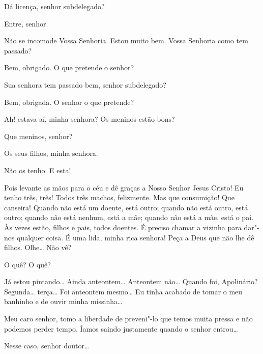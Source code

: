 \begin{linenumbers}
{}


  Dá licença, senhor
subdelegado?

 Entre, senhor. 

  Não se incomode
Vossa Senhoria. Estou muito bem. Vossa Senhoria como tem passado?

 Bem, obrigado. O que pretende o senhor?

 Sua senhora tem passado bem, senhor subdelegado?

 Bem, obrigada. O senhor o que pretende?

 Ah! estava aí, minha senhora? Os meninos estão bons?

 Que meninos, senhor?

 Os seus filhos, minha senhora.

 Não os tenho. E esta!

 Pois levante as mãos para o céu e dê graças a Nosso Senhor Jesus
Cristo!  Eu tenho três, três!
Todos três machos, felizmente. Mas que consumição! Que canseira! Quando não está
um doente, está outro; quando não está outro, está outro; quando não está
nenhum, está a mãe; quando não está a mãe, está o pai. Às vezes estão, filhos e
pais, todos doentes. É preciso chamar a
vizinha para dar"-nos qualquer coisa. É uma lida, minha rica senhora!
Peça a Deus que não lhe dê filhos. Olhe\ldots{}  Não vê?

 O quê? O quê?

 Já estou pintando\ldots{} Ainda anteontem\ldots{} Anteontem
não\ldots{} Quando foi, Apolinário? Segunda\ldots{} terça\ldots{} Foi anteontem
mesmo\ldots{}  Eu tinha acabado de tomar o meu banhinho e de ouvir minha
missinha\ldots{}

   Meu caro senhor, tomo a liberdade
de preveni"-lo que temos muita pressa e não
podemos perder tempo. Íamos saindo justamente quando o senhor entrou\ldots{}

  Nesse caso, senhor doutor\ldots{}


\end{linenumbers}
